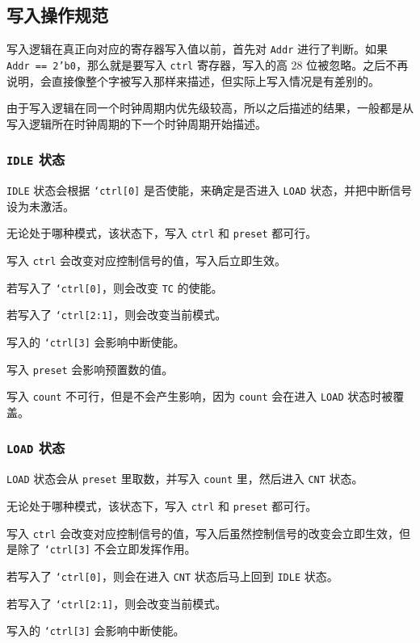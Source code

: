 \documentclass[12pt,AutoFakeBold,AutoFakeSlant]{article}
\newcommand{\ms}[1]{\texttt{#1}}
\begin{document}
\subsection{写入操作规范}

写入逻辑在真正向对应的寄存器写入值以前，首先对 \ms{Addr} 进行了判断。如果 \ms{Addr == 2'b0}，那么就是要写入 \ms{ctrl} 寄存器，写入的高 28 位被忽略。之后不再说明，会直接像整个字被写入那样来描述，但实际上写入情况是有差别的。

由于写入逻辑在同一个时钟周期内优先级较高，所以之后描述的结果，一般都是从写入逻辑所在时钟周期的下一个时钟周期开始描述。

\subsubsection{\ms{IDLE} 状态}

\ms{IDLE} 状态会根据 \ms{`ctrl[0]} 是否使能，来确定是否进入 \ms{LOAD} 状态，并把中断信号设为未激活。

无论处于哪种模式，该状态下，写入 \ms{ctrl} 和 \ms{preset} 都可行。

写入 \ms{ctrl} 会改变对应控制信号的值，写入后立即生效。

若写入了 \ms{`ctrl[0]}，则会改变 \ms{TC} 的使能。

若写入了 \ms{`ctrl[2:1]}，则会改变当前模式。

写入的 \ms{`ctrl[3]} 会影响中断使能。

写入 \ms{preset} 会影响预置数的值。

写入 \ms{count} 不可行，但是不会产生影响，因为 \ms{count} 会在进入 \ms{LOAD} 状态时被覆盖。

\subsubsection{\ms{LOAD} 状态}

\ms{LOAD} 状态会从 \ms{preset} 里取数，并写入 \ms{count} 里，然后进入 \ms{CNT} 状态。

无论处于哪种模式，该状态下，写入 \ms{ctrl} 和 \ms{preset} 都可行。

写入 \ms{ctrl} 会改变对应控制信号的值，写入后虽然控制信号的改变会立即生效，但是除了 \ms{`ctrl[3]} 不会立即发挥作用。

若写入了 \ms{`ctrl[0]}，则会在进入 \ms{CNT} 状态后马上回到 \ms{IDLE} 状态。

若写入了 \ms{`ctrl[2:1]}，则会改变当前模式。

写入的 \ms{`ctrl[3]} 会影响中断使能。
\end{document}

